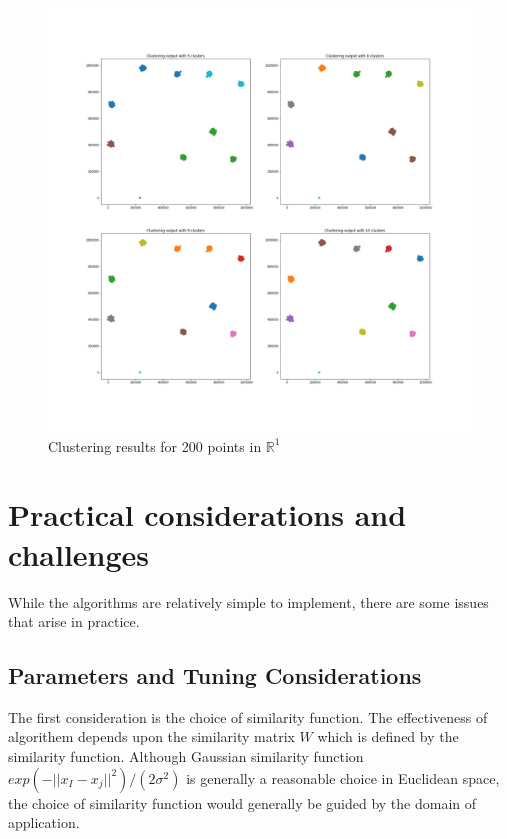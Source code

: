 \documentclass[10pt,a4paper, nocenter]{report}
\newcommand{\norm}[1]{\lvert\lvert {#1} \rvert\rvert}
\begin{document}
\begin{enumerate}
        \begin{figure}
        \includegraphics[width=\textwidth]{../../2DCluster.jpg}
        \caption{Clustering results for 200 points in $\mathbb{R}^1$}
        \label{fig:2dresults}
        \end{figure}
    \end{enumerate}
    
    
    \section{Practical considerations and challenges}

    While the algorithms are relatively simple to implement, there are some issues that arise in practice. 
    
    \subsection{Parameters and Tuning Considerations}
    The first consideration is the choice of similarity function. The effectiveness of algorithem depends upon the similarity matrix $W$ which is defined by the similarity function. Although Gaussian similarity function $exp(-\norm{x_I - x_j}^2)/(2\sigma^2)$ is generally a reasonable choice in Euclidean space, the choice of similarity function would generally be guided by the domain of application. 
\end{document}
